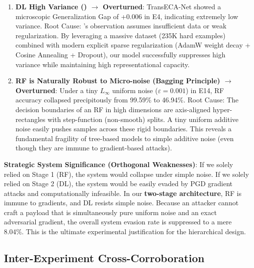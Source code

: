 \documentclass[sigconf]{acmart}
\begin{document}
\begin{enumerate}
\item \textbf{DL High Variance (\cite{5}) $\to$ Overturned}: TransECA-Net showed a microscopic Generalization Gap of +0.006 in E4, indicating extremely low variance. Root Cause: \cite{8}'s observation assumes insufficient data or weak regularization. By leveraging a massive dataset (235K hard examples) combined with modern explicit sparse regularization (AdamW weight decay + Cosine Annealing + Dropout), our model successfully suppresses high variance while maintaining high representational capacity.

\item \textbf{RF is Naturally Robust to Micro-noise (Bagging Principle) $\to$ Overturned}: Under a tiny $L_\infty$ uniform noise ($\varepsilon = 0.001$) in E14, RF accuracy collapsed precipitously from 99.59\% to 46.94\%. Root Cause: The decision boundaries of an RF in high dimensions are axis-aligned hyper-rectangles with step-function (non-smooth) splits. A tiny uniform additive noise easily pushes samples across these rigid boundaries. This reveals a fundamental fragility of tree-based models to simple additive noise (even though they are immune to gradient-based attacks).
\end{enumerate}

\textbf{Strategic System Significance (Orthogonal Weaknesses)}: If we solely relied on Stage 1 (RF), the system would collapse under simple noise. If we solely relied on Stage 2 (DL), the system would be easily evaded by PGD gradient attacks and computationally infeasible. In our \textbf{two-stage architecture}, RF is immune to gradients, and DL resists simple noise. Because an attacker cannot craft a payload that is simultaneously pure uniform noise and an exact adversarial gradient, the overall system evasion rate is suppressed to a mere 8.04\%. This is the ultimate experimental justification for the hierarchical design.

\subsection{Inter-Experiment Cross-Corroboration}
\end{document}
